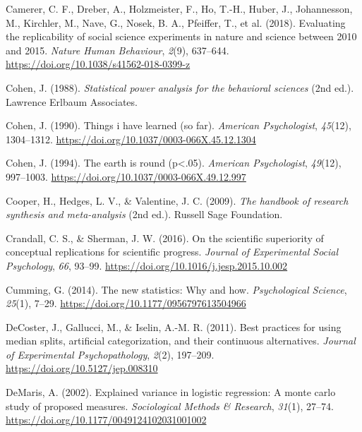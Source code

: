 \documentclass[
]{interact}
\newlength{\cslhangindent}
\newlength{\cslentryspacingunit} %
\newenvironment{CSLReferences}[2] %
 {%
  \setlength{\parindent}{0pt}
  \ifodd #1
  \let\oldpar\par
  \def\par{\hangindent=\cslhangindent\oldpar}
  \fi
  \setlength{\parskip}{#2\cslentryspacingunit}
 }%
 {}
\begin{document}
\begin{CSLReferences}{1}{0}
\leavevmode{}%
Camerer, C. F., Dreber, A., Holzmeister, F., Ho, T.-H., Huber, J.,
Johannesson, M., Kirchler, M., Nave, G., Nosek, B. A., Pfeiffer, T., et
al. (2018). Evaluating the replicability of social science experiments
in nature and science between 2010 and 2015. \emph{Nature Human
Behaviour}, \emph{2}(9), 637--644.
\url{https://doi.org/10.1038/s41562-018-0399-z}

\leavevmode{}%
Cohen, J. (1988). \emph{Statistical power analysis for the behavioral
sciences} (2nd ed.). Lawrence Erlbaum Associates.

\leavevmode{}%
Cohen, J. (1990). Things i have learned (so far). \emph{American
Psychologist}, \emph{45}(12), 1304--1312.
\url{https://doi.org/10.1037/0003-066X.45.12.1304}

\leavevmode{}%
Cohen, J. (1994). The earth is round
(p{\enspace}\textless{}{\enspace}.05). \emph{American Psychologist},
\emph{49}(12), 997--1003.
\url{https://doi.org/10.1037/0003-066X.49.12.997}

\leavevmode{}%
Cooper, H., Hedges, L. V., \& Valentine, J. C. (2009). \emph{The
handbook of research synthesis and meta-analysis} (2nd ed.). Russell
Sage Foundation.

\leavevmode{}%
Crandall, C. S., \& Sherman, J. W. (2016). On the scientific superiority
of conceptual replications for scientific progress. \emph{Journal of
Experimental Social Psychology}, \emph{66}, 93--99.
\url{https://doi.org/10.1016/j.jesp.2015.10.002}

\leavevmode{}%
Cumming, G. (2014). The new statistics: Why and how. \emph{Psychological
Science}, \emph{25}(1), 7--29.
\url{https://doi.org/10.1177/0956797613504966}

\leavevmode{}%
DeCoster, J., Gallucci, M., \& Iselin, A.-M. R. (2011). Best practices
for using median splits, artificial categorization, and their continuous
alternatives. \emph{Journal of Experimental Psychopathology},
\emph{2}(2), 197--209. \url{https://doi.org/10.5127/jep.008310}

\leavevmode{}%
DeMaris, A. (2002). Explained variance in logistic regression: A monte
carlo study of proposed measures. \emph{Sociological Methods \&
Research}, \emph{31}(1), 27--74.
\url{https://doi.org/10.1177/0049124102031001002}


\end{CSLReferences}
\end{document}

